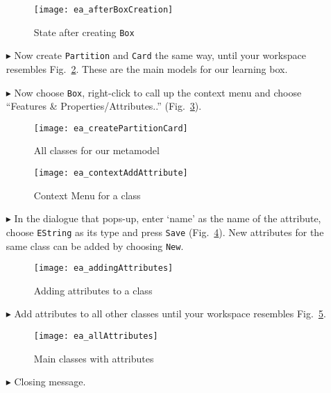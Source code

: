 \begin{itemize}
\begin{figure}[htbp]
	\centering
  \texttt{[image: ea\_afterBoxCreation]}
	\caption{State after creating \texttt{Box}}
	\label{fig:eclass_completed}
\end{figure}

\item[$\blacktriangleright$] Now create \texttt{Partition} and \texttt{Card} the same way, until your workspace resembles Fig.~\ref{fig:all_eclasses}.
These are the main models for our learning box.

\vspace{0.5cm}

\item[$\blacktriangleright$] Now choose \texttt{Box}, right-click to call up the context menu and choose ``Features \& Properties/Attributes..''
(Fig.~\ref{fig:attribute}).

\begin{figure}[htbp]
	\centering
  \texttt{[image: ea\_createPartitionCard]}
	\caption{All classes for our metamodel}
	\label{fig:all_eclasses}
\end{figure}

\begin{figure}[htbp]
	\centering
  \texttt{[image: ea\_contextAddAttribute]}
	\caption{Context Menu for a class}
	\label{fig:attribute}
\end{figure}
\FloatBarrier

\item[$\blacktriangleright$] In the dialogue that pops-up, enter `name' as the name of the attribute, choose \texttt{EString} as its type and press
\texttt{Save} (Fig.~\ref{fig:attribute_properties}). New attributes for the same class can be added by choosing \texttt{New}.

\begin{figure}[htbp]
	\centering
  \texttt{[image: ea\_addingAttributes]}
	\caption{Adding attributes to a class}
	\label{fig:attribute_properties}
\end{figure}

\item[$\blacktriangleright$] Add attributes to all other classes until your workspace resembles Fig.~\ref{fig:attribute_completed}.

\begin{figure}[htbp]
	\centering
  \texttt{[image: ea\_allAttributes]}
	\caption{Main classes with attributes}
	\label{fig:attribute_completed}
\end{figure}
\FloatBarrier

\item[$\blacktriangleright$] Closing message.


\end{itemize}
